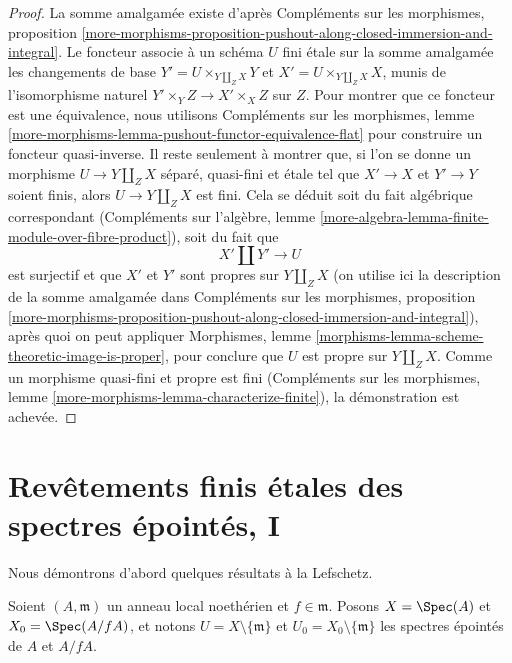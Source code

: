 \begin{proof}
La somme amalgamée existe d'après
Compléments sur les morphismes, proposition
\ref{more-morphisms-proposition-pushout-along-closed-immersion-and-integral}.
Le foncteur associe à un schéma $U$ fini étale sur la
somme amalgamée les changements de base $Y' = U \times_{Y \amalg_Z X} Y$
et $X' = U \times_{Y \amalg_Z X} X$, munis de l'isomorphisme naturel
$Y' \times_Y Z \to X' \times_X Z$ sur $Z$. Pour montrer que ce foncteur
est une équivalence, nous utilisons
Compléments sur les morphismes, lemme
\ref{more-morphisms-lemma-pushout-functor-equivalence-flat}
pour construire un foncteur quasi-inverse.
Il reste seulement à montrer que, si l'on se donne un morphisme
$U \to Y \amalg_Z X$ séparé, quasi-fini et étale
tel que $X' \to X$ et $Y' \to Y$ soient finis,
alors $U \to Y \amalg_Z X$ est fini.
Cela se déduit soit du fait algébrique correspondant
(Compléments sur l'algèbre, lemme
\ref{more-algebra-lemma-finite-module-over-fibre-product}),
soit du fait que
$$
X' \amalg Y' \to U
$$
est surjectif et que $X'$ et $Y'$ sont propres sur $Y \amalg_Z X$
(on utilise ici la description de la somme amalgamée dans Compléments sur les morphismes, proposition
\ref{more-morphisms-proposition-pushout-along-closed-immersion-and-integral}),
après quoi on peut appliquer
Morphismes, lemme \ref{morphisms-lemma-scheme-theoretic-image-is-proper},
pour conclure que $U$ est propre sur $Y \amalg_Z X$.
Comme un morphisme quasi-fini et propre est fini
(Compléments sur les morphismes, lemme \ref{more-morphisms-lemma-characterize-finite}),
la démonstration est achevée.
\end{proof}





\section{Revêtements finis étales des spectres épointés, I}
\label{section-pi1-punctured-spec}

\noindent
Nous démontrons d'abord quelques résultats à la Lefschetz.

\begin{situation}
\label{situation-local-lefschetz}
Soient $(A, \mathfrak m)$ un anneau local noethérien et $f \in \mathfrak m$.
Posons $X = \Spec(A)$ et $X_0 = \Spec(A/fA)$, et
notons $U = X \setminus \{\mathfrak m\}$ et
$U_0 = X_0 \setminus \{\mathfrak m\}$ les spectres épointés de
$A$ et $A/fA$.
\end{situation}

